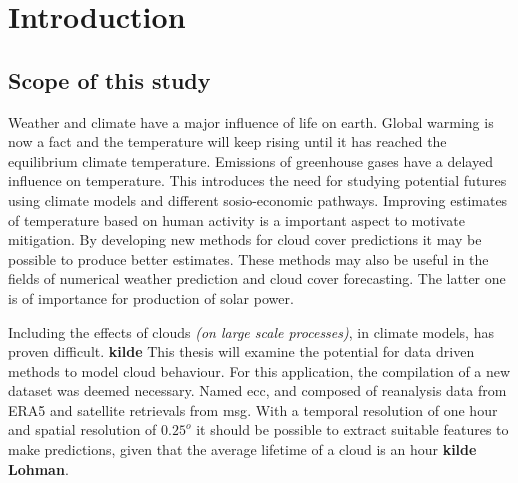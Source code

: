 \chapter{Introduction} \label{ch:introduction}
\section{Scope of this study}
Weather and climate have a major influence of life on earth. Global warming is now a fact and the temperature will keep rising until it has reached the equilibrium climate temperature. Emissions of greenhouse gases have a delayed influence on temperature. This introduces the need for studying potential futures using climate models and different sosio-economic pathways. Improving estimates of temperature based on human activity is a important aspect to motivate mitigation. %
By developing new methods for cloud cover predictions it may be possible to produce better estimates. These methods may also be useful in the fields of numerical weather prediction and cloud cover forecasting. The latter one is of importance for production of solar power.

Including the effects of clouds \textit{(on large scale processes)}, in climate models, has proven difficult. \textbf{kilde} This thesis will examine the potential for data driven methods to model cloud behaviour. For this application, the compilation of a new dataset was deemed necessary. Named \acrfull{ecc}, and composed of reanalysis data from ERA5 and satellite retrievals from \acrfull{msg}. With a temporal resolution of one hour and spatial resolution of $0.25^o$ it should be possible to extract suitable features to make predictions, given that the average lifetime of a cloud is an hour \textbf{kilde Lohman}.

